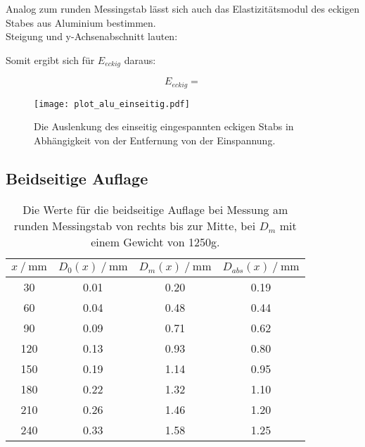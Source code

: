 Analog zum runden Messingstab lässt sich auch das Elastizitätsmodul des eckigen Stabes aus Aluminium bestimmen.\\
Steigung und y-Achsenabschnitt lauten:      %

Somit ergibt sich für $E_{eckig}$ daraus:

\begin{equation*}
  E_{eckig} =             %
\end{equation*}


\begin{figure}
  \centering
  \texttt{[image: plot\_alu\_einseitig.pdf]}
  \caption{Die Auslenkung des einseitig eingespannten eckigen Stabs in Abhängigkeit 
  von der Entfernung von der Einspannung.}
  \label{fig:plot_alu_einseitig}
\end{figure}


\subsection{Beidseitige Auflage}  %
\label{subsec:Beiseitige Auflage}


\begin{table}[H]
  \centering
  \caption{Die Werte für die beidseitige Auflage bei Messung am runden Messingstab von rechts bis zur Mitte, bei $D_m$ mit 
  einem Gewicht von 1250g.}
  \begin{tabular}{cccc}
    \toprule
    {$x \mathbin{/} \unit{\milli\metre}$} &
    {$D_0(x) \mathbin{/} \unit{\milli\metre}$} &
    {$D_m(x) \mathbin{/} \unit{\milli\metre}$} &
    {$D_{abs}(x) \mathbin{/} \unit{\milli\metre}$} \\
    \midrule
     30 & 0.01 & 0.20 & 0.19 \\  
     60 & 0.04 & 0.48 & 0.44 \\
     90 & 0.09 & 0.71 & 0.62 \\
    120 & 0.13 & 0.93 & 0.80 \\
    150 & 0.19 & 1.14 & 0.95 \\
    180 & 0.22 & 1.32 & 1.10 \\
    210 & 0.26 & 1.46 & 1.20 \\
    240 & 0.33 & 1.58 & 1.25 \\
    
    \bottomrule
  \end{tabular}
  \label{tab:Tabelle5}
\end{table}



